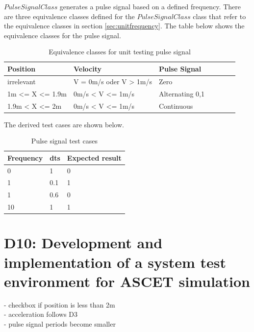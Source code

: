 $PulseSignalClass$ generates a pulse signal based on a defined frequency.
There are three equivalence classes defined for the $PulseSignalClass$ class that refer to the equivalence classes in section \ref{sec:unitfrequency}. 
The table below shows the equivalence classes for the pulse signal.
\begin{table}[H]
\centering
\caption{Equivalence classes for unit testing pulse signal}
\begin{adjustbox}{width=1\textwidth, center=\textwidth}
\renewcommand{\arraystretch}{1}
\begin{tabular}{lllllll}
\textbf{Position} & \textbf{Velocity} & \textbf{Pulse Signal} \\\hline
irrelevant & V = 0m/s oder V > 1m/s & Zero\\
1m <= X <= 1.9m  & 0m/s < V <= 1m/s & Alternating 0,1\\
1.9m < X <= 2m  & 0m/s < V <= 1m/s &Continuous
\end{tabular}
\end{adjustbox}
\end{table}

The derived test cases are shown below.

\begin{table}[H]
\centering
\caption{Pulse signal test cases}
\renewcommand{\arraystretch}{1}
\begin{tabular}{lll}
\textbf{Frequency} & \textbf{dts} & \textbf{Expected result} \\\hline
0         & 1   & 0               \\
1         & 0.1   & 1               \\
1         & 0.6   & 0               \\
10        & 1   & 1              
\end{tabular}
\end{table}

\chapter{D10: Development and implementation of a system test environment for ASCET simulation}\label{cha:D10}

- checkbox if position is less than 2m \\
- acceleration follows D3 \\
- pulse signal periods become smaller \\

